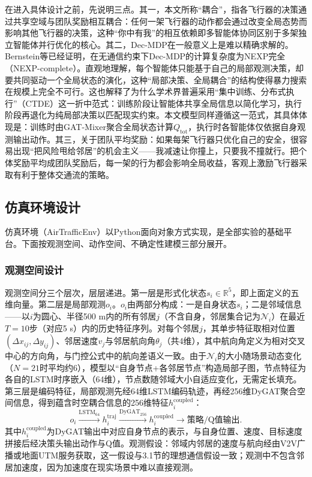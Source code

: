 \documentclass[12pt,a4paper,UTF8]{ctexart}
\begin{document}
在进入具体设计之前，先说明三点。其一，本文所称“耦合”，指各飞行器的决策通过共享空域与团队奖励相互耦合：任何一架飞行器的动作都会通过改变全局态势而影响其他飞行器的决策，这种“你中有我”的相互依赖即多智能体协同区别于多架独立智能体并行优化的核心。其二，Dec-MDP在一般意义上是难以精确求解的。Bernstein等\cite{ref41}已经证明，在无通信约束下Dec-MDP的计算复杂度为NEXP完全（NEXP-complete）。直观地理解，每个智能体只能基于自己的局部观测决策，却要共同驱动一个全局状态的演化，这种“局部决策、全局耦合”的结构使得暴力搜索在规模上完全不可行。这也解释了为什么学术界普遍采用“集中训练、分布式执行”（CTDE）这一折中范式：训练阶段让智能体共享全局信息以简化学习，执行阶段再退化为纯局部决策以匹配现实约束。本文模型同样遵循这一范式，其具体体现是：训练时由GAT-Mixer聚合全局状态计算$Q_{\text{tot}}$，执行时各智能体仅依据自身观测输出动作。其三，关于团队平均奖励：如果每架飞行器只优化自己的安全，很容易出现“把风险甩给邻居”的机会主义——我减速让你撞上，只要我不撞就行。把个体奖励平均成团队奖励后，每一架的行为都会影响全局收益，客观上激励飞行器采取有利于整体交通流的策略。

\subsection{仿真环境设计}

仿真环境（AirTrafficEnv）以Python面向对象方式实现，是全部实验的基础平台。下面按观测空间、动作空间、不确定性建模三部分展开。

\subsubsection{观测空间设计}

观测空间分三个层次，层层递进。第一层是形式化状态$s_i\in\mathbb{R}^5$，即上面定义的五维向量。第二层是局部观测$o_i$。$o_i$由两部分构成：一是自身状态$s_i$；二是邻域信息——以$i$为圆心、半径500 m内的所有邻居$j$（不含自身，邻居集合记为$\mathcal{N}_i$）在最近$T=10$步（对应5 s）内的历史特征序列。对每个邻居$j$，其单步特征取相对位置$(\Delta x_{ij}, \Delta y_{ij})$、邻居速度$v_j$与邻居航向角$\theta_j$（共4维），其中航向角定义为相对交叉中心的方向角，与门控公式中的航向差语义一致。由于$\mathcal{N}_i$的大小随场景动态变化（$N=21$时平均约6），模型以“自身节点+各邻居节点”构造局部子图，节点特征为各自的LSTM时序嵌入（64维），节点数随邻域大小自适应变化，无需定长填充。第三层是编码特征，局部观测先经64维LSTM编码轨迹，再经256维DyGAT聚合空间信息，得到蕴含时空耦合信息的256维特征$h_i^{\text{coupled}}$：
\begin{equation}
    o_i \xrightarrow{\text{LSTM}_{64}} h_i^{\text{traj}} \xrightarrow{\text{DyGAT}_{256}} h_i^{\text{coupled}} \rightarrow \text{策略/Q值输出}.
    \label{eq:encoding_chain}
\end{equation}
其中$h_i^{\text{coupled}}$为DyGAT输出中对应自身节点的表示，与自身位置、速度、目标速度拼接后经决策头输出动作与Q值。观测假设：邻域内邻居的速度与航向经由V2V广播或地面UTM服务获取，这一假设与3.1节的理想通信假设一致；观测中不包含邻居加速度，因为加速度在现实场景中难以直接观测。
\end{document}
